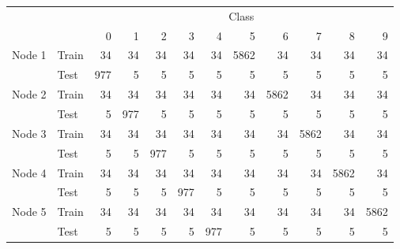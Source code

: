 \begin{tabular}{llrrrrrrrrrr}
\toprule
         &      & \multicolumn{10}{c}{Class} \\
         &      &     0 &    1 &    2 &    3 &    4 &     5 &     6 &     7 &     8 &     9 \\
\midrule
\multirow{2}{*}{Node 1} & Train &    34 &   34 &   34 &   34 &   34 &  5862 &    34 &    34 &    34 &    34 \\
         & Test &   977 &    5 &    5 &    5 &    5 &     5 &     5 &     5 &     5 &     5 \\
\cline{1-12}
\multirow{2}{*}{Node 2} & Train &    34 &   34 &   34 &   34 &   34 &    34 &  5862 &    34 &    34 &    34 \\
         & Test &     5 &  977 &    5 &    5 &    5 &     5 &     5 &     5 &     5 &     5 \\
\cline{1-12}
\multirow{2}{*}{Node 3} & Train &    34 &   34 &   34 &   34 &   34 &    34 &    34 &  5862 &    34 &    34 \\
         & Test &     5 &    5 &  977 &    5 &    5 &     5 &     5 &     5 &     5 &     5 \\
\cline{1-12}
\multirow{2}{*}{Node 4} & Train &    34 &   34 &   34 &   34 &   34 &    34 &    34 &    34 &  5862 &    34 \\
         & Test &     5 &    5 &    5 &  977 &    5 &     5 &     5 &     5 &     5 &     5 \\
\cline{1-12}
\multirow{2}{*}{Node 5} & Train &    34 &   34 &   34 &   34 &   34 &    34 &    34 &    34 &    34 &  5862 \\
         & Test &     5 &    5 &    5 &    5 &  977 &     5 &     5 &     5 &     5 &     5 \\
\bottomrule
\end{tabular}
